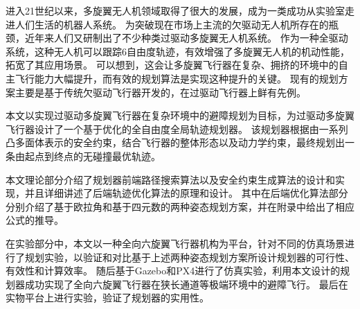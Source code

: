 \begin{cabstract}
  进入21世纪以来，多旋翼无人机领域取得了很大的发展，成为一类成功从实验室走进人们生活的机器人系统。
  为突破现在市场上主流的欠驱动无人机所存在的瓶颈，近年来人们又研制出了不少种类过驱动多旋翼无人机系统。
  作为一种全驱动系统，这种无人机可以跟踪6自由度轨迹，有效增强了多旋翼无人机的机动性能，拓宽了其应用场景。
  可以想到，这会让多旋翼飞行器在复杂、拥挤的环境中的自主飞行能力大幅提升，而有效的规划算法是实现这种提升的关键。
  现有的规划方案主要是基于传统欠驱动飞行器开发的，在过驱动飞行器上鲜有先例。

  本文以实现过驱动多旋翼飞行器在复杂环境中的避障规划为目标，为过驱动多旋翼飞行器设计了一个基于优化的全自由度全局轨迹规划器。
  该规划器根据由一系列凸多面体表示的安全约束，结合飞行器的整体形态以及动力学约束，最终规划出一条由起点到终点的无碰撞最优轨迹。

  本文理论部分介绍了规划器前端路径搜索算法以及安全约束生成算法的设计和实现，并且详细讲述了后端轨迹优化算法的原理和设计。
  其中在后端优化算法部分分别介绍了基于欧拉角和基于四元数的两种姿态规划方案，并在附录中给出了相应公式的推导。

  在实验部分中，本文以一种全向六旋翼飞行器机构为平台，针对不同的仿真场景进行了规划实验，以验证和对比基于上述两种姿态规划方案所设计规划器的可行性、有效性和计算效率。
  随后基于Gazebo和PX4进行了仿真实验，利用本文设计的规划器成功实现了全向六旋翼飞行器在狭长通道等极端环境中的避障飞行。
  最后在实物平台上进行实验，验证了规划器的实用性。



\end{cabstract}


